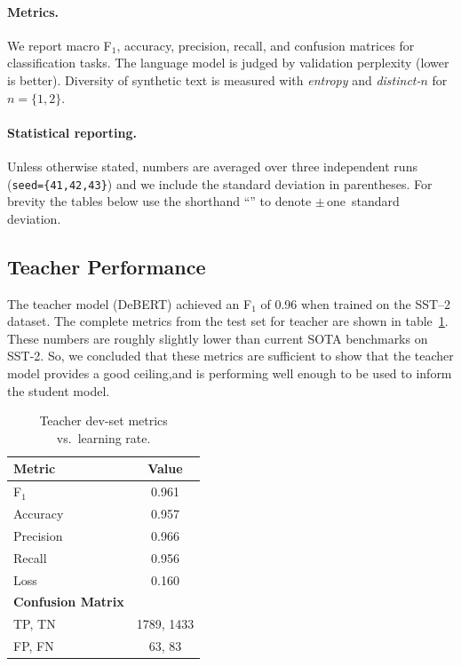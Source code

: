 \documentclass[11pt]{article}
\begin{document}
\paragraph{Metrics.}
We report macro F$_1$, accuracy, precision, recall, and confusion
matrices for classification tasks.  The language model is judged by
validation perplexity (lower is better).  Diversity of synthetic text is
measured with \emph{entropy} and \emph{distinct-$n$} for $n=\{1,2\}$.

\paragraph{Statistical reporting.}
Unless otherwise stated, numbers are averaged over three independent
runs (\texttt{seed=\{41,42,43\}}) and we include the standard deviation
in parentheses.  For brevity the tables below use the shorthand
``\textpm'' to denote $\pm$\,one~standard deviation.

\subsection{Teacher Performance}
\label{sec:teacher-results}

The teacher model (DeBERT) achieved an F$_1$ of 0.96 when trained on
the SST--2 dataset.
The complete metrics from the test set for teacher are shown in
table~\ref{tab:teacher-metrics}. These numbers are roughly
slightly lower than current SOTA benchmarks on SST-2. So, we concluded
that these metrics are sufficient to show that the teacher model
provides a good ceiling,and is performing well enough to be used to
inform the student model.

\begin{table}[htbp]
  \centering

  \begin{tabular}{@{}lc@{}}
    \toprule
    \textbf{Metric} & \textbf{Value} \\
    \midrule
    F$_1$  & 0.961  \\
    Accuracy & 0.957 \\
    Precision & 0.966 \\
    Recall & 0.956 \\
    Loss & 0.160 \\
    \midrule
    \textbf{Confusion Matrix} & \\
    TP, TN & 1789, 1433 \\
    FP, FN & 63, 83 \\
    \bottomrule
  \end{tabular}
  \caption{Teacher dev-set metrics vs.\ learning rate.}
  \label{tab:teacher-metrics}
\end{table}
\end{document}
